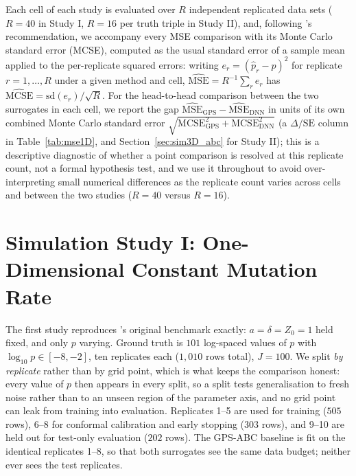 \documentclass[sn-basic,iicol,pdflatex]{sn-jnl}
\begin{document}
Each cell of each study is evaluated over $R$ independent replicated data
sets ($R=40$ in Study I, $R=16$ per truth triple in Study II), and, following
\citeauthor{morris2019}'s recommendation, we accompany every MSE comparison
with its Monte Carlo standard error (MCSE), computed as the usual standard
error of a sample mean applied to the per-replicate squared errors: writing
$e_r = (\hat p_r - p)^2$ for replicate $r=1,\dots,R$ under a given method and
cell, $\widehat{\mathrm{MSE}} = R^{-1}\sum_r e_r$ has
$\widehat{\mathrm{MCSE}} = \mathrm{sd}(e_r)/\sqrt{R}$. For the head-to-head
comparison between the two surrogates in each cell, we report the gap
$\widehat{\mathrm{MSE}}_{\mathrm{GPS}} - \widehat{\mathrm{MSE}}_{\mathrm{DNN}}$
in units of its own combined Monte Carlo standard error $\sqrt{\mathrm{MCSE}_{\mathrm{GPS}}^2
+ \mathrm{MCSE}_{\mathrm{DNN}}^2}$ (a $\Delta/\mathrm{SE}$ column in
Table~\ref{tab:mse1D}, and Section~\ref{sec:sim3D_abc} for Study II); this is a descriptive diagnostic
of whether a point comparison is resolved at this replicate count, not a
formal hypothesis test, and we use it throughout to avoid over-interpreting
small numerical differences as the replicate count varies across cells and
between the two studies ($R=40$ versus $R=16$).

\section{Simulation Study I: One-Dimensional Constant Mutation Rate}
\label{sec:sim1D}

The first study reproduces \citeauthor{lu2023}'s original benchmark exactly:
$a=\delta=Z_0=1$ held fixed, and only $p$ varying. Ground truth is
$101$ log-spaced values of $p$ with $\log_{10}p \in [-8,-2]$, ten replicates
each ($1{,}010$ rows total), $J=100$. We split \emph{by replicate} rather than by grid point, which is what keeps the
comparison honest: every value of $p$ then appears in every split, so a split
tests generalisation to fresh noise rather than to an unseen region of the
parameter axis, and no grid point can leak from training into evaluation.
Replicates 1--5 are used for training ($505$ rows), 6--8 for conformal
calibration and early stopping ($303$ rows), and 9--10 are held out for
test-only evaluation ($202$ rows). The GPS-ABC baseline is fit on the identical
replicates 1--8, so that both surrogates see the same data budget; neither ever
sees the test replicates.
\end{document}
